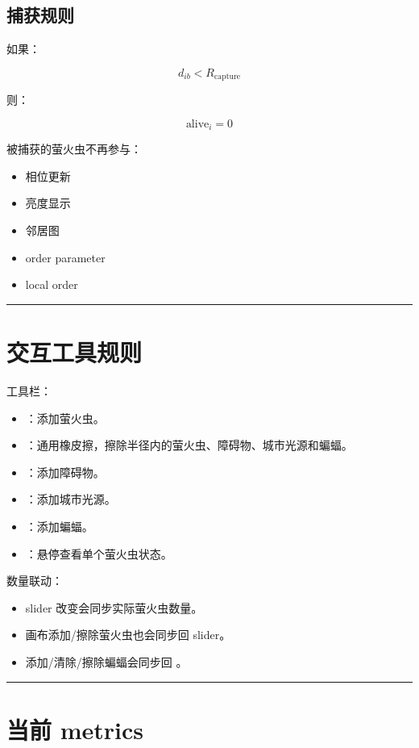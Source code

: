 \documentclass[UTF8]{ctexart}
\begin{document}
\subsection{捕获规则}

如果：

\[
d_{ib}<R_{\text{capture}}
\]

则：

\[
\text{alive}_i=0
\]

被捕获的萤火虫不再参与：

\begin{itemize}
\item 相位更新
\item 亮度显示
\item 邻居图
\item order parameter
\item local order
\end{itemize}

\bigskip
\hrule
\bigskip

\section{交互工具规则}

工具栏：

\begin{itemize}
\item \texttt{\detokenize{+}}：添加萤火虫。
\item \texttt{\detokenize{-}}：通用橡皮擦，擦除半径内的萤火虫、障碍物、城市光源和蝙蝠。
\item \texttt{}：添加障碍物。
\item \texttt{\detokenize{*}}：添加城市光源。
\item \texttt{}：添加蝙蝠。
\item \texttt{}：悬停查看单个萤火虫状态。
\end{itemize}

数量联动：

\begin{itemize}
\item \texttt{} slider 改变会同步实际萤火虫数量。
\item 画布添加/擦除萤火虫也会同步回 \texttt{} slider。
\item 添加/清除/擦除蝙蝠会同步回 \texttt{}。
\end{itemize}

\bigskip
\hrule
\bigskip

\section{当前 metrics}
\end{document}

